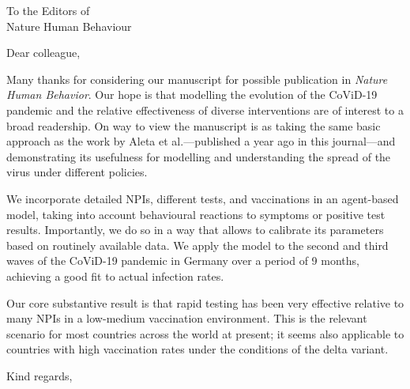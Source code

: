 \documentclass[USenglish, 10pt, UBonn_letterhead]{scrlttr2}
\begin{document}


\begin{letter}{%
        To the Editors of\\
        Nature Human Behaviour \\
    }

    \opening{Dear colleague,}

    Many thanks for considering our manuscript for possible publication in
    \textit{Nature Human Behavior}. Our hope is that modelling the evolution of the
    CoViD-19 pandemic and the relative effectiveness of diverse interventions are of
    interest to a broad readership. On way to view the manuscript is as taking the same
    basic approach as the work by Aleta et al.---published a year ago in this
    journal---and demonstrating its usefulness for modelling and understanding the
    spread of the virus under different policies.

    We incorporate detailed NPIs, different tests, and vaccinations in an agent-based
    model, taking into account behavioural reactions to symptoms or positive test
    results. Importantly, we do so in a way that allows to calibrate its parameters
    based on routinely available data. We apply the model to the second and third waves
    of the CoViD-19 pandemic in Germany over a period of 9 months, achieving a good fit
    to actual infection rates.
    
    Our core substantive result is that rapid testing has been very effective relative
    to many NPIs in a low-medium vaccination environment. This is the relevant scenario
    for most countries across the world at present; it seems also applicable to countries
    with high vaccination rates under the conditions of the delta variant.

    \closing{Kind regards,}

\end{letter}
\end{document}
